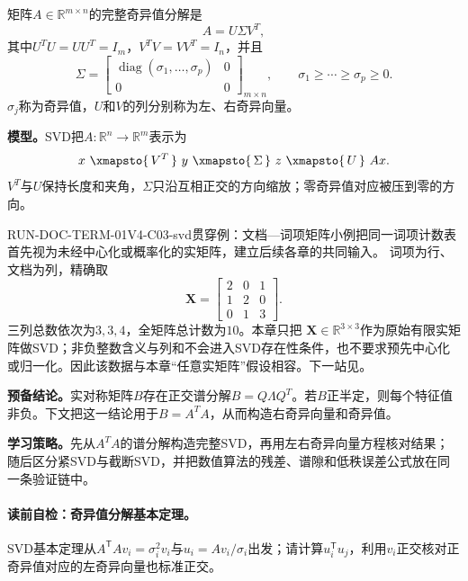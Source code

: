 \begin{definition}[完整奇异值分解]\label{def:V4-C03-full-svd}
矩阵$A\in\mathbb R^{m\times n}$的完整奇异值分解是
\[
A=U\Sigma V^T,
\]
其中$U^TU=UU^T=I_m$，$V^TV=VV^T=I_n$，并且
\[
\Sigma=
\begin{bmatrix}
\operatorname{diag}(\sigma_1,\ldots,\sigma_p)&0\\
0&0
\end{bmatrix}_{m\times n},
\qquad
\sigma_1\geq\cdots\geq\sigma_p\geq0.
\]
$\sigma_j$称为奇异值，$U$和$V$的列分别称为左、右奇异向量。
\end{definition}

\label{struct:V4-C03-CH08}
\textbf{模型。}SVD把$A:\mathbb R^n\to\mathbb R^m$表示为
\[
x\ \xmapsto{\,V^T\,}\ y
\ \xmapsto{\,\Sigma\,}\ z
\ \xmapsto{\,U\,}\ Ax.
\]
$V^T$与$U$保持长度和夹角，$\Sigma$只沿互相正交的方向缩放；零奇异值对应被压到零的方向。

\begin{SLRunningExample}{RUN-DOC-TERM-01}{V4-C03-svd}{贯穿例：文档—词项矩阵小例}{把同一词项计数表首先视为未经中心化或概率化的实矩阵，建立后续各章的共同输入。}
词项为行、文档为列，精确取
\[
\boldsymbol X=\begin{bmatrix}2&0&1\\1&2&0\\0&1&3\end{bmatrix}.
\]
三列总数依次为$3,3,4$，全矩阵总计数为$10$。本章只把
$\boldsymbol X\in\mathbb R^{3\times3}$作为原始有限实矩阵做SVD；非负整数含义与列和不会进入SVD存在性条件，也不要求预先中心化或归一化。因此该数据与本章“任意实矩阵”假设相容。下一站见。
\end{SLRunningExample}

\textbf{预备结论。}实对称矩阵$B$存在正交谱分解$B=Q\Lambda Q^T$。若$B$正半定，则每个特征值非负。下文把这一结论用于$B=A^TA$，从而构造右奇异向量和奇异值。


\label{struct:V4-C03-CH09}
\textbf{学习策略。}先从$A^TA$的谱分解构造完整SVD，再用左右奇异向量方程核对结果；随后区分紧SVD与截断SVD，并把数值算法的残差、谱隙和低秩误差公式放在同一条验证链中。

\paragraph{读前自检：奇异值分解基本定理。}SVD基本定理从$A^{\mathsf T}Av_i=\sigma_i^2v_i$与$u_i=Av_i/\sigma_i$出发；请计算$u_i^{\mathsf T}u_j$，利用$v_i$正交核对正奇异值对应的左奇异向量也标准正交。\par

